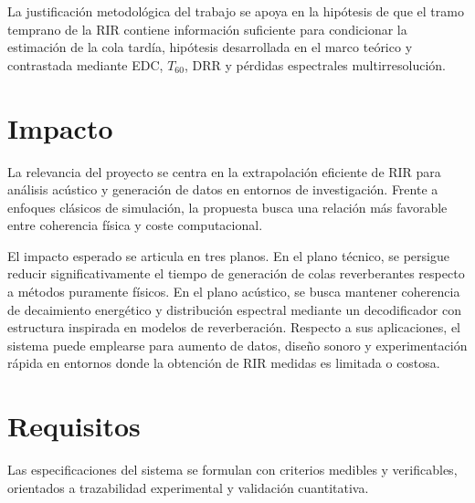 La justificación metodológica del trabajo se apoya en la hipótesis de que el tramo temprano de la RIR contiene información suficiente para condicionar la estimación de la cola tardía, hipótesis desarrollada en el marco teórico y contrastada mediante EDC, $T_{60}$, DRR y pérdidas espectrales multirresolución.

\section{Impacto}

La relevancia del proyecto se centra en la extrapolación eficiente de RIR para análisis acústico y generación de datos en entornos de investigación. Frente a enfoques clásicos de simulación, la propuesta busca una relación más favorable entre coherencia física y coste computacional.

El impacto esperado se articula en tres planos. En el plano técnico, se persigue reducir significativamente el tiempo de generación de colas reverberantes respecto a métodos puramente físicos. En el plano acústico, se busca mantener coherencia de decaimiento energético y distribución espectral mediante un decodificador con estructura inspirada en modelos de reverberación. Respecto a sus aplicaciones, el sistema puede emplearse para aumento de datos, diseño sonoro y experimentación rápida en entornos donde la obtención de RIR medidas es limitada o costosa.

\section{Requisitos}

Las especificaciones del sistema se formulan con criterios medibles y verificables, orientados a trazabilidad experimental y validación cuantitativa.

